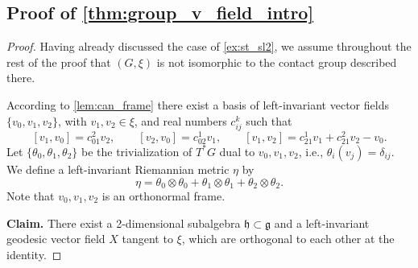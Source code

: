 \documentclass[reqno]{amsart}
\theoremstyle{remark}
\theoremstyle{plain}
\begin{document}
\subsection{Proof of \cref{thm:group_v_field_intro}}\label{sec:proof_group_field}
\begin{proof}
Having already discussed the case of \cref{ex:st_sl2}, we assume throughout the rest of the proof that $(G,\xi)$ is not isomorphic to the contact group described there.

According to \cref{lem:can_frame} there exist a basis of left-invariant vector fields $\{v_0,v_1,v_2\}$, with $v_1,v_2\in\xi$, and real numbers $c_{ij}^k$ such that 
\begin{equation}\label{eq:st_const}
	[v_1,v_0]=c_{01}^2v_2,\qquad 
	[v_2,v_0]=c_{02}^1v_1,\qquad
	[v_1,v_2]=c_{21}^1v_1+c_{21}^2v_2-v_0.
\end{equation}
Let $\{\theta_0,\theta_1,\theta_2\}$ be the trivialization of $T^*G$ dual to $v_0,v_1,v_2$, i.e., $\theta_i(v_j)=\delta_{ij}$. We define a left-invariant Riemannian metric $\eta$ by 
\begin{equation}
	\eta=\theta_0\otimes \theta_0+\theta_1\otimes\theta_1+\theta_2\otimes\theta_2.
\end{equation}
Note that $v_0,v_1,v_2$ is an orthonormal frame. 

\noindent
\textbf{Claim.} There exist a 2-dimensional subalgebra $\mathfrak h\subset \mathfrak g$ and a left-invariant geodesic vector field $X$ tangent to $\xi$, which are orthogonal to each other at the identity. 


\end{proof}
\end{document}
